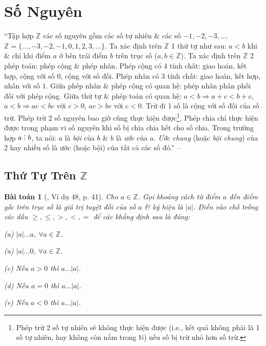 \documentclass{article}
\numberwithin{equation}{section}
\newtheorem{baitoan}{Bài toán}
\DeclareRobustCommand{\divby}{%
	\mathrel{\vbox{\baselineskip.65ex\lineskiplimit0pt\hbox{.}\hbox{.}\hbox{.}}}%
}
\begin{document}
\section{Số Nguyên}
``Tập hợp $\mathbb{Z}$ các số nguyên gồm các số tự nhiên \& các số $-1,-2,-3,\ldots$. $\mathbb{Z} = \{\ldots,-3,-2,-1,0,1,2,3,\ldots\}$. Ta xác định trên $\mathbb{Z}$ 1 thứ tự như sau: $a < b$ khi \& chỉ khi điểm $a$ ở bên trái điểm $b$ trên trục số ($a,b\in\mathbb{Z}$). Ta xác định trên $\mathbb{Z}$ 2 phép toán: phép cộng \& phép nhân. Phép cộng có 4 tính chất: giao hoán, kết hợp, cộng với số $0$, cộng với số đối. Phép nhân có 3 tính chất: giao hoán, kết hợp, nhân với số $1$. Giữa phép nhân \& phép cộng có quan hệ: phép nhân phân phối đối với phép cộng. Giữa thứ tự \& phép toán có quan hệ: $a < b\Rightarrow a + c < b + c$, $a < b\Rightarrow ac < bc$ với $c > 0$, $ac > bc$ với $c < 0$. Trừ đi 1 số là cộng với số đối của số trừ. Phép trừ 2 số nguyên bao giờ cũng thực hiện được\footnote{Phép trừ 2 số tự nhiên sẽ không thực hiện được (i.e., kết quả không phải là 1 số tự nhiên, hay không còn nằm trong $\mathbb{N}$) nếu số bị trừ nhỏ hơn số trừ.}. Phép chia chỉ thực hiện được trong phạm vi số nguyên khi số bị chia chia hết cho số chia. Trong trường hợp $a\divby b$, ta nói: $a$ là \textit{bội} của $b$ \& $b$ là \textit{ước} của $a$. \textit{Ước chung} (hoặc \textit{bội chung}) của 2 hay nhiều số là ước (hoặc bội) của tất cả các số đó.'' -- \cite[Chap. II, p. 41]{Binh_Toan_6_tap_1}


\subsection{Thứ Tự Trên $\mathbb{Z}$}

\begin{baitoan}[\cite{Binh_Toan_6_tap_1}, Ví dụ 48, p. 41]
	Cho $a\in\mathbb{Z}$. Gọi khoảng cách từ điểm $a$ đến điểm gốc trên trục số là \emph{giá trị tuyệt đối} của số $a$ \& ký hiệu là $|a|$. Điền vào chỗ trống các dấu $\ge,\le,>,<,=$ để các khẳng định sau là đúng:
	\begin{enumerate*}
		\item[(a)] $|a|\ldots a$, $\forall a\in\mathbb{Z}$.
		\item[(a)] $|a|\ldots 0$, $\forall a\in\mathbb{Z}$.
		\item[(c)] Nếu $a > 0$ thì $a\ldots|a|$.
		\item[(d)] Nếu $a = 0$ thì $a\ldots|a|$.
		\item[(e)] Nếu $a < 0$ thì $a\ldots|a|$.
	\end{enumerate*}
\end{baitoan}
\end{document}
